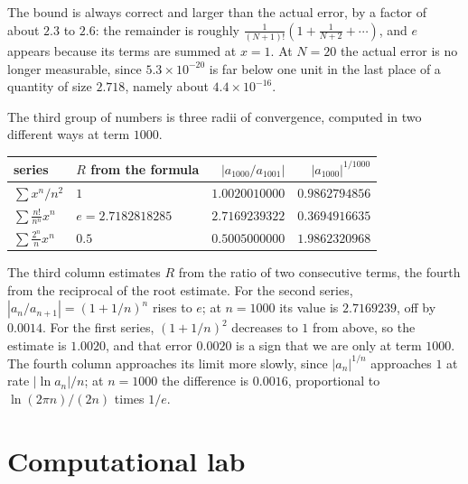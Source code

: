 The bound is always correct and larger than the actual error, by a factor of
about $2.3$ to $2.6$: the remainder is roughly
$\frac{1}{(N+1)!}\left(1+\frac{1}{N+2}+\cdots\right)$, and $e$ appears because
its terms are summed at $x=1$. At $N=20$ the actual error is no longer measurable,
since $5.3\times10^{-20}$ is far below one unit in the last place of a quantity of
size $2.718$, namely about $4.4\times10^{-16}$.

The third group of numbers is three radii of convergence, computed in two
different ways at term $1000$.

\begin{center}
\small
\begin{tabular}{llrr}
\hline
series & $R$ from the formula & $|a_{1000}/a_{1001}|$ & $|a_{1000}|^{1/1000}$\\
\hline
$\sum x^n/n^2$          & $1$              & $1.0020010000$ & $0.9862794856$\\
$\sum \frac{n!}{n^n}x^n$ & $e=2.7182818285$ & $2.7169239322$ & $0.3694916635$\\
$\sum \frac{2^n}{n}x^n$  & $0.5$            & $0.5005000000$ & $1.9862320968$\\
\hline
\end{tabular}
\end{center}

The third column estimates $R$ from the ratio of two consecutive terms, the fourth from
the reciprocal of the root estimate. For the second series, $|a_n/a_{n+1}|=(1+1/n)^n$ rises to
$e$; at $n=1000$ its value is $2.7169239$, off by $0.0014$. For the first series,
$(1+1/n)^2$ decreases to $1$ from above, so the estimate is $1.0020$, and that error
$0.0020$ is a sign that we are only at term $1000$. The fourth column approaches
its limit more slowly, since $|a_n|^{1/n}$ approaches $1$ at rate $|\ln a_n|/n$; at
$n=1000$ the difference is $0.0016$, proportional to $\ln(2\pi n)/(2n)$ times $1/e$.


\section{Computational lab}

